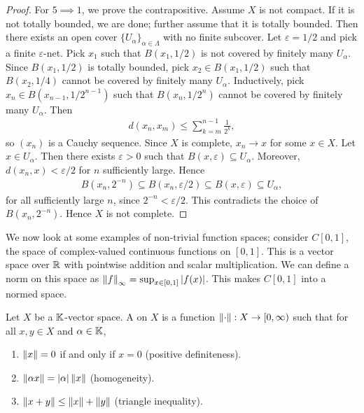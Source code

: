 \begin{proof}
    For $5 \implies 1$, we prove the contrapositive. Assume $X$ is not compact. If it is not totally bounded, we are done; further assume that it is totally bounded. Then there exists an open cover $\{U_{\alpha}\}_{\alpha\in\Lambda}$ with no finite subcover. Let $\varepsilon=1/2$ and pick a finite $\varepsilon$-net. Pick $x_1$ such that $B(x_1,1/2)$ is not covered by finitely many $U_{\alpha}$. Since $B(x_1,1/2)$ is totally bounded, pick $x_2\in B(x_1,1/2)$ such that $B(x_2,1/4)$ cannot be covered by finitely many $U_{\alpha}$. Inductively, pick $x_n\in B(x_{n-1},1/2^{n-1})$ such that $B(x_n,1/2^n)$ cannot be covered by finitely many $U_{\alpha}$. Then
    \begin{align}
        d(x_n,x_m)\le\sum_{k=m}^{n-1}\frac{1}{2^k},
    \end{align}
    so $(x_n)$ is a Cauchy sequence. Since $X$ is complete, $x_n\to x$ for some $x\in X$. Let $x\in U_{\alpha}$. Then there exists $\varepsilon>0$ such that $B(x,\varepsilon)\subseteq U_{\alpha}$. Moreover, $d(x_n,x)<\varepsilon/2$ for $n$ sufficiently large. Hence
    \begin{align}
        B(x_n,2^{-n})\subseteq B(x_n,\varepsilon/2)\subseteq B(x,\varepsilon)\subseteq U_{\alpha},
    \end{align}
    for all sufficiently large $n$, since $2^{-n}<\varepsilon/2$. This contradicts the choice of $B(x_n,2^{-n})$. Hence $X$ is not complete.
\end{proof}

We now look at some examples of non-trivial function spaces; consider $C[0,1]$, the space of complex-valued continuous functions on $[0,1]$. This is a vector space over $\mathbb{R}$ with pointwise addition and scalar multiplication. We can define a norm on this space as $\left\lVert f\right\rVert_{\infty} = \sup_{x \in [0,1]} \left| f(x) \right|$. This makes $C[0,1]$ into a normed space.

\begin{definition}
    Let $X$ be a $\mathbb{K}$-vector space. A  on $X$ is a function $\left\lVert\cdot\right\rVert:X\to[0,\infty)$ such that for all $x,y\in X$ and $\alpha\in\mathbb{K}$,
    \begin{enumerate}
        \item $\left\lVert x\right\rVert=0$ if and only if $x=0$ (positive definiteness).
        \item $\left\lVert\alpha x\right\rVert=\left| \alpha \right|\left\lVert x\right\rVert$ (homogeneity).
        \item $\left\lVert x+y\right\rVert\le\left\lVert x\right\rVert+\left\lVert y\right\rVert$ (triangle inequality).
    \end{enumerate}
\end{definition}

